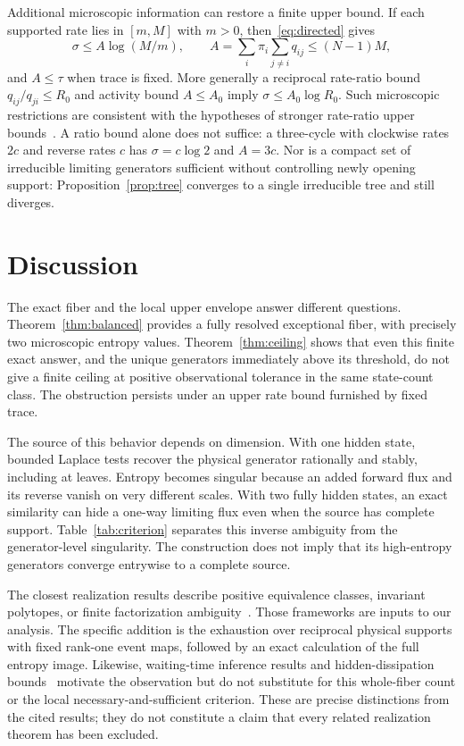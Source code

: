 \documentclass[aps,pre,onecolumn,11pt,longbibliography,notitlepage]{revtex4-2}
\newcommand{\1}{\mathbf 1}
\newcommand{\sig}{\sigma}
\begin{document}
Additional microscopic information can restore a finite upper bound. If each supported rate lies in $[m,M]$ with $m>0$, then~\eqref{eq:directed} gives
\begin{equation}
 \sig\le A\log(M/m),\qquad
 A=\sum_i\pi_i\sum_{j\ne i}q_{ij}\le(N-1)M,\label{eq:activity}
\end{equation}
and $A\le\tau$ when trace is fixed. More generally a reciprocal rate-ratio bound $q_{ij}/q_{ji}\le R_0$ and activity bound $A\le A_0$ imply $\sig\le A_0\log R_0$. Such microscopic restrictions are consistent with the hypotheses of stronger rate-ratio upper bounds~\cite{NishiyamaHasegawa2023}. A ratio bound alone does not suffice: a three-cycle with clockwise rates $2c$ and reverse rates $c$ has $\sig=c\log2$ and $A=3c$. Nor is a compact set of irreducible limiting generators sufficient without controlling newly opening support: Proposition~\ref{prop:tree} converges to a single irreducible tree and still diverges.

\section{Discussion}
The exact fiber and the local upper envelope answer different questions. Theorem~\ref{thm:balanced} provides a fully resolved exceptional fiber, with precisely two microscopic entropy values. Theorem~\ref{thm:ceiling} shows that even this finite exact answer, and the unique generators immediately above its threshold, do not give a finite ceiling at positive observational tolerance in the same state-count class. The obstruction persists under an upper rate bound furnished by fixed trace.

The source of this behavior depends on dimension. With one hidden state, bounded Laplace tests recover the physical generator rationally and stably, including at leaves. Entropy becomes singular because an added forward flux and its reverse vanish on very different scales. With two fully hidden states, an exact similarity can hide a one-way limiting flux even when the source has complete support. Table~\ref{tab:criterion} separates this inverse ambiguity from the generator-level singularity. The construction does not imply that its high-entropy generators converge entrywise to a complete source.

The closest realization results describe positive equivalence classes, invariant polytopes, or finite factorization ambiguity~\cite{Vanluyten2008,HorvathTelek2007,HeZhang2006,Mond2003}. Those frameworks are inputs to our analysis. The specific addition is the exhaustion over reciprocal physical supports with fixed rank-one event maps, followed by an exact calculation of the full entropy image. Likewise, waiting-time inference results and hidden-dissipation bounds~\cite{vanDerMeer2022,Harunari2022,Maier2025,Ehrich2021} motivate the observation but do not substitute for this whole-fiber count or the local necessary-and-sufficient criterion. These are precise distinctions from the cited results; they do not constitute a claim that every related realization theorem has been excluded.
\end{document}
